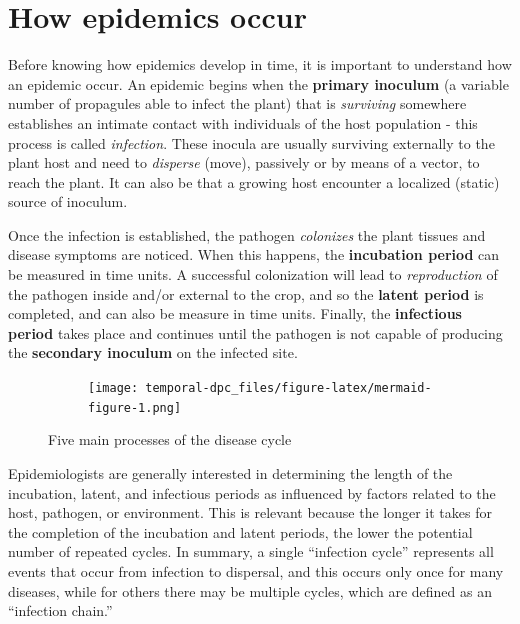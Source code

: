 \documentclass[
  letterpaper,
]{book}
\begin{document}
\hypertarget{how-epidemics-occur}{%
\section{How epidemics occur}\label{how-epidemics-occur}}

Before knowing how epidemics develop in time, it is important to
understand how an epidemic occur. An epidemic begins when the
\textbf{primary inoculum} (a variable number of propagules able to
infect the plant) that is \emph{surviving} somewhere establishes an
intimate contact with individuals of the host population - this process
is called \emph{infection}. These inocula are usually surviving
externally to the plant host and need to \emph{disperse} (move),
passively or by means of a vector, to reach the plant. It can also be
that a growing host encounter a localized (static) source of inoculum.

Once the infection is established, the pathogen \emph{colonizes} the
plant tissues and disease symptoms are noticed. When this happens, the
\textbf{incubation period} can be measured in time units. A successful
colonization will lead to \emph{reproduction} of the pathogen inside
and/or external to the crop, and so the \textbf{latent period} is
completed, and can also be measure in time units. Finally, the
\textbf{infectious period} takes place and continues until the pathogen
is not capable of producing the \textbf{secondary inoculum} on the
infected site.

\begin{figure}

\begin{figure}[H]

\texttt{[image: temporal-dpc\_files/figure-latex/mermaid-figure-1.png]} \hfill{}

\end{figure}

\caption{\label{fig-diagram}Five main processes of the disease cycle}

\end{figure}

Epidemiologists are generally interested in determining the length of
the incubation, latent, and infectious periods as influenced by factors
related to the host, pathogen, or environment. This is relevant because
the longer it takes for the completion of the incubation and latent
periods, the lower the potential number of repeated cycles. In summary,
a single ``infection cycle'' represents all events that occur from
infection to dispersal, and this occurs only once for many diseases,
while for others there may be multiple cycles, which are defined as an
``infection chain.''
\end{document}
